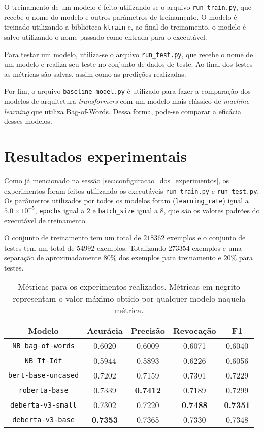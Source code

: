 O treinamento de um modelo é feito utilizando-se o arquivo
\texttt{run\_train.py}, que recebe o nome do modelo e outros parâmetros de
treinamento. O modelo é treinado utilizando a biblioteca \texttt{ktrain} e, ao
final do treinamento, o modelo é salvo utilizando o nome passado como entrada
para o executável.

Para testar um modelo, utiliza-se o arquivo \texttt{run\_test.py}, que recebe o
nome de um modelo e realiza seu teste no conjunto de dados de teste. Ao final
dos testes as métricas são salvas, assim como as predições realizadas.

Por fim, o arquivo \texttt{baseline\_model.py} é utilizado para fazer a
comparação dos modelos de arquitetura \textit{transformers} com um modelo mais
clássico de \textit{machine learning} que utiliza Bag-of-Words. Dessa forma,
pode-se comparar a eficácia desses modelos.

\section{Resultados experimentais}%
\label{sec:resultados_experimentais}

Como já mencionado na sessão \ref{sec:configuracao_dos_experimentos}, os
experimentos foram feitos utilizando os executáveis \texttt{run\_train.py} e
\texttt{run\_test.py}. Os parâmetros utilizados por todos os modelos foram
(\texttt{learning\_rate}) igual a $5.0\times 10^{-5}$, \texttt{epochs} igual a
$2$ e \texttt{batch\_size} igual a $8$, que são os valores padrões do executável
de treinamento.

O conjunto de treinamento tem um total de $218362$ exemplos e o conjunto de
testes tem um total de $54992$ exemplos. Totalizando $273354$ exemplos e uma
separação de aproximadamente $80\%$ dos exemplos para treinamento e $20\%$ para
testes.

\begin{table}[h]
\centering
\caption{Métricas para os experimentos realizados. Métricas em negrito
   representam o valor máximo obtido por qualquer modelo naquela métrica.}
\label{tab:experiments}
\begin{tabular}{c | c c c c}
   \textbf{Modelo} & \textbf{Acurácia} & \textbf{Precisão} & \textbf{Revocação}
                  & \textbf{F1} \\ \hline \hline
   \texttt{NB bag-of-words} & 0.6020 & 0.6009 & 0.6071 & 0.6040 \\
   \texttt{NB Tf-Idf} & 0.5944 & 0.5893 & 0.6226 & 0.6056 \\ \hline
   \texttt{bert-base-uncased} & 0.7202 & 0.7159 & 0.7301 & 0.7229 \\
   \texttt{roberta-base} & 0.7339 & \textbf{0.7412} & 0.7189 & 0.7299 \\
   \texttt{deberta-v3-small} & 0.7302 & 0.7220 & \textbf{0.7488} & \textbf{0.7351} \\
   \texttt{deberta-v3-base} & \textbf{0.7353} & 0.7365 & 0.7330 & 0.7348 \\ \hline
\end{tabular}
\end{table}

